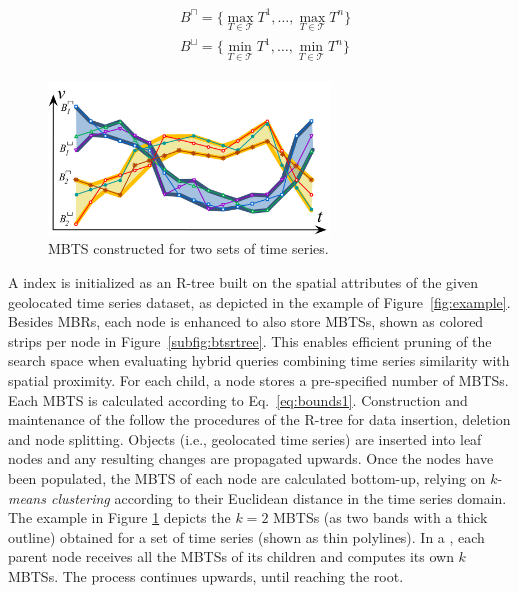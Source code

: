 \begin{align}\label{eq:bounds1}
 \begin{split}
  & B^{\sqcap} = \{ \max_{T \in \mathcal{T}} T^1, \ldots, \max_{T \in \mathcal{T}} T^n \} \\
  & B^{\sqcup} = \{ \min_{T \in \mathcal{T}} T^1, \ldots, \min_{T \in \mathcal{T}} T^n \}
 \end{split}
\end{align}

\begin{figure}[tb]
    \centering
    \includegraphics[width=75mm]{Figures/mbts.png}
    \caption{MBTS constructed for two sets of time series.}
    \label{fig:example_bundle}
\end{figure}


A \btsr index is initialized as an R-tree \cite{Guttman1984} built on the spatial attributes of the given geolocated time series dataset, as depicted in the example of Figure~\ref{fig:example}. Besides MBRs, each node is enhanced to also store MBTSs, shown as colored strips per node in Figure~\ref{subfig:btsrtree}. This enables efficient pruning of the search space when evaluating hybrid queries combining time series similarity with spatial proximity.
For each child, a node stores a pre-specified number of MBTSs. Each MBTS is calculated according to Eq.~\ref{eq:bounds1}. Construction and maintenance of the \btsr follow the procedures of the R-tree for data insertion, deletion and node splitting. Objects (i.e., geolocated time series) are inserted into leaf nodes and any resulting changes are propagated upwards. Once the nodes have been populated, the MBTS of each node are calculated bottom-up, relying on $k$-\textit{means clustering} according to their Euclidean distance in the time series domain. The example in Figure \ref{fig:example_bundle} depicts the $k=2$ MBTSs (as two bands with a thick outline) obtained for a set of time series (shown as thin polylines). In a \btsr, each parent node receives all the MBTSs of its children and computes its own $k$ MBTSs. The process continues upwards, until reaching the root.

